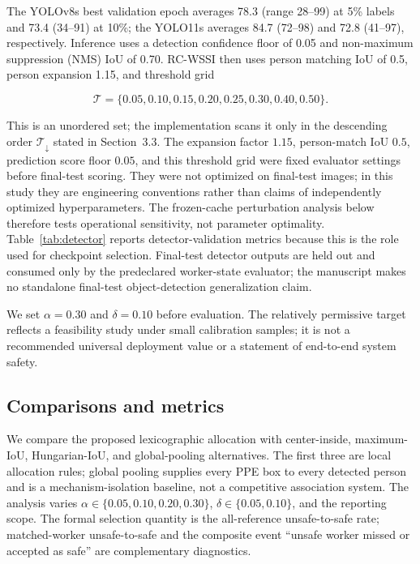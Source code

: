 \documentclass[iicol,pdflatex,sn-mathphys-num]{sn-jnl}
\begin{document}
The YOLOv8s best validation epoch averages 78.3 (range 28--99) at 5\% labels and 73.4 (34--91) at 10\%; the YOLO11s averages 84.7 (72--98) and 72.8 (41--97), respectively. Inference uses a detection confidence floor of 0.05 and non-maximum suppression (NMS) IoU of 0.70. RC-WSSI then uses person matching IoU of 0.5, person expansion 1.15, and threshold grid

\begin{equation}
\mathcal{T}=\{0.05,0.10,0.15,0.20,0.25,0.30,0.40,0.50\}.
\end{equation}

This is an unordered set; the implementation scans it only in the descending order $\mathcal{T}_{\downarrow}$ stated in Section~3.3. The expansion factor $1.15$, person-match IoU $0.5$, prediction score floor $0.05$, and this threshold grid were fixed evaluator settings before final-test scoring. They were not optimized on final-test images; in this study they are engineering conventions rather than claims of independently optimized hyperparameters. The frozen-cache perturbation analysis below therefore tests operational sensitivity, not parameter optimality. Table~\ref{tab:detector} reports detector-validation metrics because this is the role used for checkpoint selection. Final-test detector outputs are held out and consumed only by the predeclared worker-state evaluator; the manuscript makes no standalone final-test object-detection generalization claim.

We set $\alpha=0.30$ and $\delta=0.10$ before evaluation. The relatively permissive target reflects a feasibility study under small calibration samples; it is not a recommended universal deployment value or a statement of end-to-end system safety.

\subsection{Comparisons and metrics}

We compare the proposed lexicographic allocation with center-inside, maximum-IoU, Hungarian-IoU, and global-pooling alternatives. The first three are local allocation rules; global pooling supplies every PPE box to every detected person and is a mechanism-isolation baseline, not a competitive association system. The analysis varies $\alpha\in\{0.05,0.10,0.20,0.30\}$, $\delta\in\{0.05,0.10\}$, and the reporting scope. The formal selection quantity is the all-reference unsafe-to-safe rate; matched-worker unsafe-to-safe and the composite event ``unsafe worker missed or accepted as safe'' are complementary diagnostics.
\end{document}
